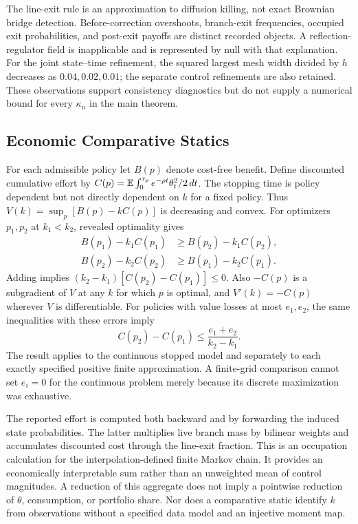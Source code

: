 The line-exit rule is an approximation to diffusion killing, not exact Brownian bridge detection. Before-correction overshoots, branch-exit frequencies, occupied exit probabilities, and post-exit payoffs are distinct recorded objects. A reflection-regulator field is inapplicable and is represented by null with that explanation. For the joint state--time refinement, the squared largest mesh width divided by $h$ decreases as $0.04,0.02,0.01$; the separate control refinements are also retained. These observations support consistency diagnostics but do not supply a numerical bound for every $\kappa_n$ in the main theorem.

\subsection{Economic Comparative Statics}
For each admissible policy let $B(p)$ denote cost-free benefit. Define discounted cumulative effort by $C(p)=\mathbb E\int_0^{\tau_p}e^{-\rho t}\theta_t^2/2\,dt$. The stopping time is policy dependent but not directly dependent on $k$ for a fixed policy. Thus $V(k)=\sup_p[B(p)-kC(p)]$ is decreasing and convex. For optimizers $p_1,p_2$ at $k_1<k_2$, revealed optimality gives
\begin{align*}
 B(p_1)-k_1C(p_1)&\geq B(p_2)-k_1C(p_2),\\
 B(p_2)-k_2C(p_2)&\geq B(p_1)-k_2C(p_1).
\end{align*}
Adding implies $(k_2-k_1)[C(p_2)-C(p_1)]\leq0$. Also $-C(p)$ is a subgradient of $V$ at any $k$ for which $p$ is optimal, and $V'(k)=-C(p)$ wherever $V$ is differentiable. For policies with value losses at most $e_1,e_2$, the same inequalities with these errors imply
\[
 C(p_2)-C(p_1)\leq\frac{e_1+e_2}{k_2-k_1}.
\]
The result applies to the continuous stopped model and separately to each exactly specified positive finite approximation. A finite-grid comparison cannot set $e_i=0$ for the continuous problem merely because its discrete maximization was exhaustive.

The reported effort is computed both backward and by forwarding the induced state probabilities. The latter multiplies live branch mass by bilinear weights and accumulates discounted cost through the line-exit fraction. This is an occupation calculation for the interpolation-defined finite Markov chain. It provides an economically interpretable sum rather than an unweighted mean of control magnitudes. A reduction of this aggregate does not imply a pointwise reduction of $\theta$, consumption, or portfolio share. Nor does a comparative static identify $k$ from observations without a specified data model and an injective moment map.
